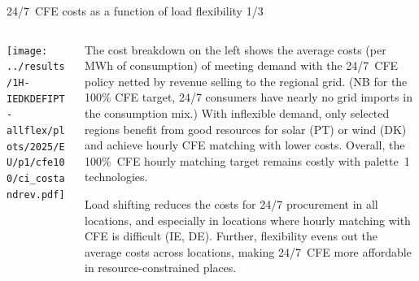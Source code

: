 \begin{frame}{24/7~CFE costs as a function of load flexibility 1/3}

  {\footnotesize
  \vspace{0.2cm}
  
  \begin{columns}[T]
  \begin{column}{9cm}
  \centering
  \texttt{[image: ../results/1H-IEDKDEFIPT-allflex/plots/2025/EU/p1/cfe100/ci\_costandrev.pdf]}
  \end{column}

  \begin{column}{6cm}
  The \alert{cost breakdown} on the left shows the average costs (per MWh of consumption) of meeting demand with the 24/7~CFE policy netted by revenue selling to the regional grid. (NB for the 100\% CFE target, 24/7 consumers have nearly no grid imports in the consumption mix.) With inflexible demand, only selected regions benefit from good resources for solar (PT) or wind (DK) and achieve hourly CFE matching with lower costs. Overall, the 100\%~CFE hourly matching target remains costly with palette~1 technologies.

  \vspace{0.1cm}
  \alert{Load shifting reduces the costs for 24/7 procurement in all locations}, and especially in locations where hourly matching with CFE is difficult (IE, DE). Further, flexibility evens out the average costs across locations, making 24/7~CFE more affordable in resource-constrained places.

  \end{column}
  \end{columns}
  }
\end{frame}
  


